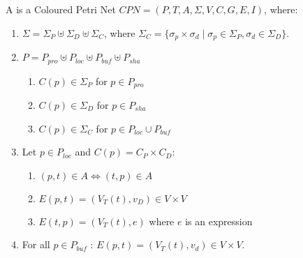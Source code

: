 \begin{definition}
\label{def:propcpn}
A  is a Coloured Petri Net $\mathit{CPN} =
(P,T,A,\Sigma,V,C,G,E,I)$, where:

\begin{enumerate}
\item $\Sigma = \Sigma_{P} \uplus \Sigma_{D} \uplus \Sigma_{C}$, where $\Sigma_{C} = \{\sigma_{p} \times \sigma_{d} \mid \sigma_{p} \in \Sigma_{P}, \sigma_{d} \in \Sigma_{D}\}$.

\item $P = P_{pro} \uplus P_{loc} \uplus P_{buf} \uplus P_{sha}$

\begin{enumerate}
\item $C(p) \in \Sigma_{P}$ for $p \in P_{pro}$
\item $C(p) \in \Sigma_{D}$ for $p \in P_{sha}$
\item $C(p) \in \Sigma_{C}$ for $p \in P_{loc} \cup P_{buf}$
\end{enumerate}

\item Let $p \in P_{loc}$ and $C(p) = C_{P} \times C_{D}$:

\begin{enumerate}
\item $(p, t) \in A \Leftrightarrow (t, p) \in A$
\item $E(p, t) = (V_{T}(t), v_{D}) \in V \times V$
\item $E(t, p) = (V_{T}(t), e)$ where $e$ is an expression%
\end{enumerate}

\item For all $p \in P_{buf}$ : $E(p, t) = (V_{T}(t), v_{d}) \in V \times V$.


\end{enumerate}
\end{definition}
